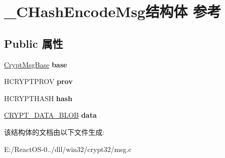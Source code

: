 \hypertarget{struct___c_hash_encode_msg}{}\section{\+\_\+\+C\+Hash\+Encode\+Msg结构体 参考}
\label{struct___c_hash_encode_msg}
\subsection*{Public 属性}
\begin{DoxyCompactItemize}
\item 
\mbox{\label{struct___c_hash_encode_msg_a8d5f032159f10f90260947364fd56448}} 
\hyperlink{struct___crypt_msg_base}{Crypt\+Msg\+Base} {\bfseries base}
\item 
\mbox{\label{struct___c_hash_encode_msg_a8470da5a2802f26594011fbc42eae6a0}} 
H\+C\+R\+Y\+P\+T\+P\+R\+OV {\bfseries prov}
\item 
\mbox{\label{struct___c_hash_encode_msg_a517eab80f78a9e73d8e11c1bb5d3a55e}} 
H\+C\+R\+Y\+P\+T\+H\+A\+SH {\bfseries hash}
\item 
\mbox{\label{struct___c_hash_encode_msg_aa4b6e9b50fdabfedca6d9723469e192c}} 
\hyperlink{struct___c_r_y_p_t_o_a_p_i___b_l_o_b}{C\+R\+Y\+P\+T\+\_\+\+D\+A\+T\+A\+\_\+\+B\+L\+OB} {\bfseries data}
\end{DoxyCompactItemize}


该结构体的文档由以下文件生成\+:\begin{DoxyCompactItemize}
\item 
E\+:/\+React\+O\+S-\/0../dll/win32/crypt32/msg.\+c\end{DoxyCompactItemize}
